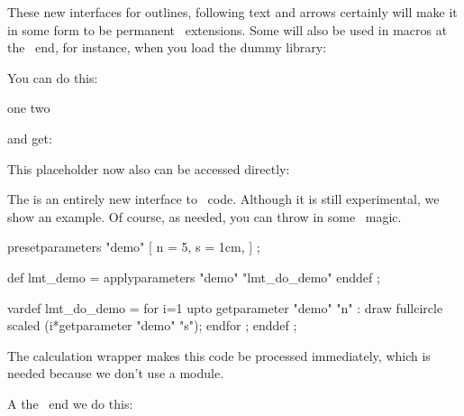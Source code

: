 \typebuffer[option=TEX]

\startlinecorrection
\getbuffer
\stoplinecorrection

These new interfaces for outlines, following text and arrows certainly will make
it in some form to be permanent \METAFUN\ extensions. Some will also be used in
macros at the \TEX\ end, for instance, when you load the dummy library:

\startbuffer
\useMPlibrary[dum]
\stopbuffer

\typebuffer[option=TEX] \getbuffer

You can do this:

\startbuffer
\startcombination
    {\externalfigure[crap-001]} {one}
    {\externalfigure[crap-004][alternative=triangle]} {two}
\stopcombination
\stopbuffer

\typebuffer[option=TEX]

and get:

\startlinecorrection
\getbuffer
\stoplinecorrection

This placeholder now also can be accessed directly:

\startbuffer
\useMPmacro
  [minifun]
  [placeholder]
  [width=10cm,
   height=3cm,
   reduction=.2,
   alternative=triangle,
   color=orange]
\stopbuffer

\typebuffer[option=TEX]

\startlinecorrection
\getbuffer
\stoplinecorrection

The \type {\useMPmacro} is an entirely new interface to \METAFUN\ code. Although
it is still experimental, we show an example. Of course, as needed, you can throw
in some \LUA\ magic.

\startbuffer
\startMPcalculation
    presetparameters "demo" [
        n = 5,
        s = 1cm,
    ] ;

    def lmt_demo = applyparameters "demo" "lmt_do_demo" enddef ;

    vardef lmt_do_demo =
        for i=1 upto getparameter "demo" "n" :
            draw fullcircle scaled (i*getparameter "demo" "s");
        endfor ;
    enddef ;
\stopMPcalculation
\stopbuffer

\typebuffer[option=TEX]

The calculation wrapper makes this code be processed immediately, which is needed
because we don't use a module.

\getbuffer

A the \TEX\ end we do this:

\startbuffer
{}
\stopbuffer

